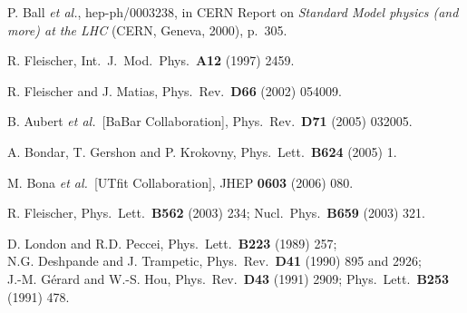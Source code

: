 \documentclass[12pt]{article}
\begin{document}
\begin{thebibliography}{999}
P. Ball {\it et al.}, hep-ph/0003238,
in CERN Report on {\it Standard Model physics (and more) at
the LHC} (CERN, Geneva, 2000), p.\ 305.

R. Fleischer,
  { Int.\ J.\ Mod.\ Phys.}~{\bf A12} (1997) 2459.

R. Fleischer and J. Matias,
  { Phys.\ Rev.}~{\bf D66} (2002) 054009.

B. Aubert {\it et al.}\  [BaBar Collaboration],
  { Phys.\ Rev.}~{\bf D71} (2005) 032005.
  
A. Bondar, T. Gershon and P. Krokovny,
  { Phys.\ Lett.}~{\bf B624} (2005) 1.
  
  M. Bona {\it et al.}\  [UTfit Collaboration],
 JHEP {\bf 0603} (2006) 080.
 
R. Fleischer,
  { Phys.\ Lett.}~{\bf B562} (2003) 234;
  { Nucl.\ Phys.}~{\bf B659} (2003) 321.

D. London and R.D. Peccei,
{ Phys.\ Lett.}~{\bf B223} (1989) 257;\\
N.G. Deshpande and J. Trampetic,  
{ Phys.\ Rev.}~{\bf D41} (1990) 895 and 2926;\\
J.-M. G\'erard and W.-S. Hou, { Phys.\ Rev.}~{\bf D43} (1991) 2909; 
{ Phys.\ Lett.}~{\bf B253} (1991) 478.



\end{thebibliography}
\end{document}
